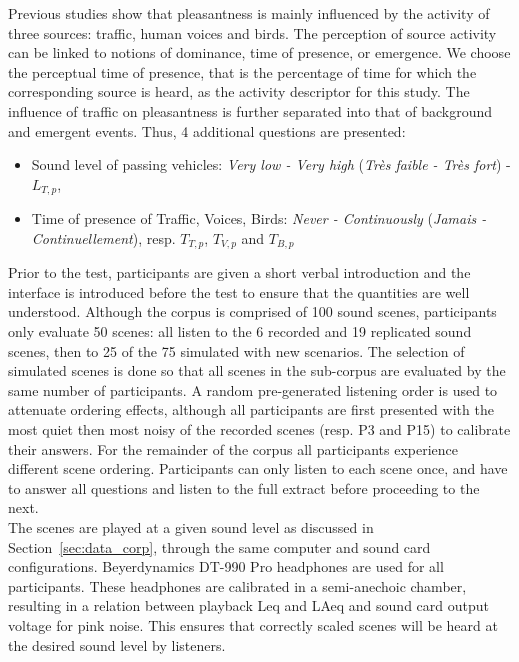 \documentclass[11pt,a4paper]{article}
\begin{document}
Previous studies show that pleasantness is mainly influenced by the activity of three sources: traffic, human voices and birds. The perception of source activity can be linked to notions of dominance, time of presence, or emergence. We choose the perceptual time of presence, that is the percentage of time for which the corresponding source is heard, as the activity descriptor for this study. The influence of traffic on pleasantness is further separated into that of background and emergent events. Thus, 4 additional questions are presented:
\begin{itemize}
\item Sound level of passing vehicles: \textit{Very low - Very high} (\textit{Tr\`es faible - Tr\`es fort}) - $L_{T, p}$,
\item Time of presence of Traffic, Voices, Birds: \textit{Never - Continuously} (\textit{Jamais - Continuellement}), resp. $T_{T, p}$, $T_{V, p}$ and $T_{B, p}$
\end{itemize}

Prior to the test, participants are given a short verbal introduction and the interface is introduced before the test to ensure that the quantities are well understood. Although the corpus is comprised of 100 sound scenes, participants only evaluate 50 scenes: all listen to the 6 recorded and 19 replicated sound scenes, then to 25 of the 75 simulated with new scenarios. The selection of simulated scenes is done so that all scenes in the sub-corpus are evaluated by the same number of participants. A random pre-generated listening order is used to attenuate ordering effects, although all participants are first presented with the most quiet then most noisy of the recorded scenes (resp. P3 and P15) to calibrate their answers. For the remainder of the corpus all participants experience different scene ordering. Participants can only listen to each scene once, and have to answer all questions and listen to the full extract before proceeding to the next.\\

The scenes are played at a given sound level as discussed in Section~\ref{sec:data_corp}, through the same computer and sound card configurations. Beyerdynamics DT-990 Pro headphones are used for all participants. These headphones are calibrated in a semi-anechoic chamber, resulting in a relation between playback Leq and LAeq and sound card output voltage for pink noise. This ensures that correctly scaled scenes will be heard at the desired sound level by listeners.\\
\end{document}
